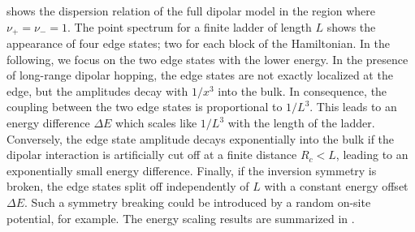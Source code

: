  shows the dispersion relation of the full dipolar model in the region where $\nu_+ = \nu_- = 1$.
The point spectrum for a finite ladder of length $L$ shows the appearance of four edge states; two for each block of the Hamiltonian.
In the following, we focus on the two edge states with the lower energy.
In the presence of long-range dipolar hopping, the edge states are not exactly localized at the edge, but the amplitudes decay with $1/x^3$ into the bulk.
In consequence, the coupling between the two edge states is proportional to $1/L^3$.
This leads to an energy difference $\Delta E$ which scales like $1/L^3$ with the length of the ladder.
Conversely, the edge state amplitude decays exponentially into the bulk if the dipolar interaction is artificially cut off at a finite distance $R_c < L$, leading to an exponentially small energy difference.
Finally, if the inversion symmetry is broken, the edge states split off independently of $L$ with a constant energy offset $\Delta E$.
Such a symmetry breaking could be introduced by a random on-site potential, for example.
The energy scaling results are summarized in .

